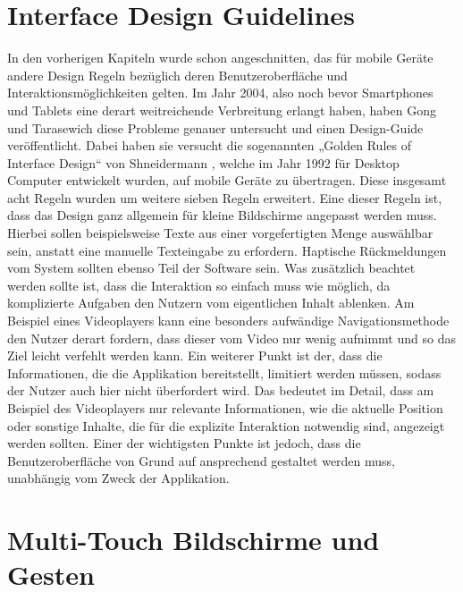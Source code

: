 \documentclass[11pt,a4paper]{report}
\begin{document}
\section{Interface Design Guidelines}

In den vorherigen Kapiteln wurde schon angeschnitten, das für mobile Geräte andere Design Regeln bezüglich deren Benutzeroberfläche und Interaktionsmöglichkeiten gelten. Im Jahr 2004, also noch bevor Smartphones und Tablets eine derart weitreichende Verbreitung erlangt haben, haben Gong und Tarasewich \cite{gong2004guidelines} diese Probleme genauer untersucht und einen Design-Guide veröffentlicht. Dabei haben sie versucht die sogenannten „Golden Rules of Interface Design“ von Shneidermann \cite{shneiderman1992designing}, welche im Jahr 1992 für Desktop Computer entwickelt wurden, auf mobile Geräte zu übertragen. Diese insgesamt acht Regeln wurden um weitere sieben Regeln erweitert. Eine dieser Regeln ist, dass das Design ganz allgemein für kleine Bildschirme angepasst werden muss. Hierbei sollen beispielsweise Texte aus einer vorgefertigten Menge auswählbar sein, anstatt eine manuelle Texteingabe zu erfordern. Haptische Rückmeldungen vom System sollten ebenso Teil der Software sein. Was zusätzlich beachtet werden sollte ist, dass die Interaktion so einfach muss wie möglich, da komplizierte Aufgaben den Nutzern vom eigentlichen Inhalt ablenken. Am Beispiel eines Videoplayers kann eine besonders aufwändige Navigationsmethode den Nutzer derart fordern, dass dieser vom Video nur wenig aufnimmt und so das Ziel leicht verfehlt werden kann. Ein weiterer Punkt ist der, dass die Informationen, die die Applikation bereitstellt, limitiert werden müssen, sodass der Nutzer auch hier nicht überfordert wird. Das bedeutet im Detail, dass am Beispiel des Videoplayers nur relevante Informationen, wie die aktuelle Position oder sonstige Inhalte, die für die explizite Interaktion notwendig sind, angezeigt werden sollten. Einer der wichtigsten Punkte ist jedoch, dass die Benutzeroberfläche von Grund auf ansprechend gestaltet werden muss, unabhängig vom Zweck der Applikation. \cite{gong2004guidelines}

\section{Multi-Touch Bildschirme und Gesten}
\end{document}
